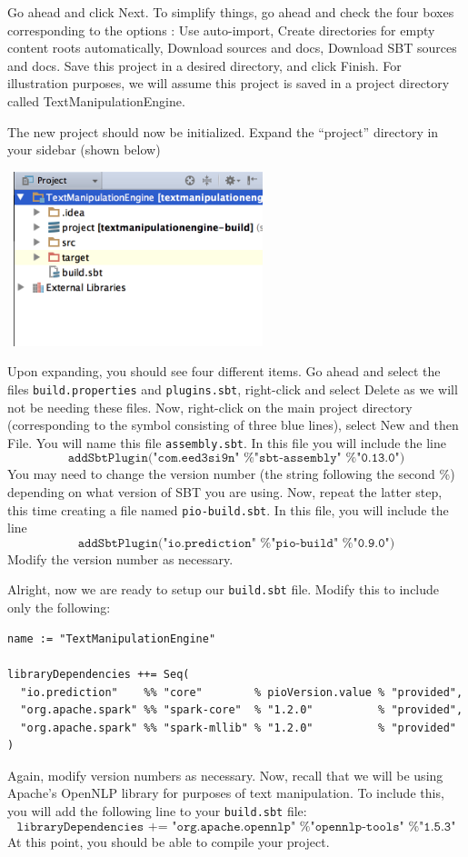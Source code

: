 \documentclass[a4paper,12pt]{article}
\renewcommand{\tt}[1]{\texttt{#1}}
\newcommand{\3}{\left}
\newcommand{\4}{\right}
\renewcommand{\-}[1]{{}^{-#1}}
\begin{document}
Go ahead and click Next. To simplify things, go ahead and check the four boxes corresponding to the options : Use auto-import, Create directories for empty content roots automatically, Download sources and docs, Download SBT sources and docs. Save this project in a desired directory, and click Finish. For illustration purposes, we will assume this project is saved in a project directory called TextManipulationEngine.

The new project should now be initialized. Expand the \enquote{project} directory in your sidebar (shown below)

\begin{center}
\vspace{0.6cm}
\includegraphics[width=3in, height=2in, keepaspectratio=true, trim=0em 3em 0em 3em]{img2.png}
\end{center}
\vspace{0.5cm}


Upon expanding, you should see four different items. Go ahead and select the files \tt{build.properties} and \tt{plugins.sbt}, right-click and select Delete as we will not be needing these files. Now, right-click on the main project directory (corresponding to the symbol consisting of three blue lines), select New and then File. You will name this file \tt{assembly.sbt}. In this file you will include the line
$$
\tt{addSbtPlugin("com.eed3si9n" \% "sbt-assembly" \% "0.13.0")}
$$
You may need to change the version number (the string following the second \%) depending on what version of SBT you are using. Now, repeat the latter step, this time creating a file named \tt{pio-build.sbt}. In this file, you will include the line
$$
\tt{addSbtPlugin("io.prediction" \% "pio-build" \% "0.9.0")}
$$
Modify the version number as necessary. 

Alright, now we are ready to setup our \tt{build.sbt} file. Modify this to include only the following:
\begin{verbatim}
name := "TextManipulationEngine"

libraryDependencies ++= Seq(
  "io.prediction"    %% "core"        % pioVersion.value % "provided",
  "org.apache.spark" %% "spark-core"  % "1.2.0"          % "provided",
  "org.apache.spark" %% "spark-mllib" % "1.2.0"          % "provided"
)
\end{verbatim}
Again, modify version numbers as necessary. Now, recall that we will be using Apache's OpenNLP library for purposes of text manipulation. To include this, you will add the following line to your \tt{build.sbt} file:
$$
\tt{libraryDependencies += "org.apache.opennlp" \% "opennlp-tools" \% "1.5.3"}
$$
At this point, you should be able to compile your project. 
\end{document}
